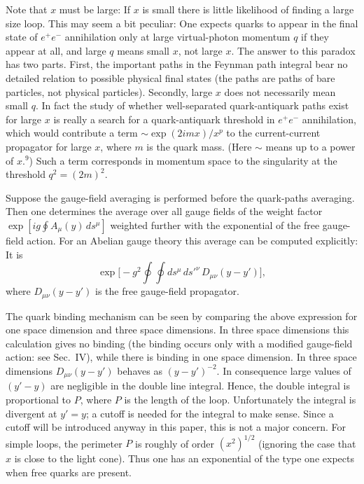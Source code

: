 Note that $x$ must be large:  If $x$ is small there is little likelihood
of finding a large size loop.  This may seem a bit peculiar:  One expects
quarks to appear in the final state of $e^{+}e^{-}$ annihilation only at
large virtual-photon momentum $q$ if they appear at all, and large $q$
means small $x$, not large $x$.  The answer to this paradox has two
parts.  First, the important paths in the Feynman path integral bear no
detailed relation to possible physical final states (the paths are paths
of bare particles, not physical particles).  Secondly, large $x$ does
not necessarily mean small $q$.  In fact the study of whether
well-separated quark-antiquark paths exist for large $x$ is really a
search for a quark-antiquark threshold in $e^{+}e^{-}$ annihilation,
which would contribute a term $\sim \exp(2imx)/x^{p}$ to the
current-current propagator for large $x$, where $m$ is the quark mass.
(Here $\sim$ means up to a power of $x$.${}^{9}$)  Such a term
corresponds in momentum space to the singularity at the threshold
$q^{2} = (2m)^{2}$.

Suppose the gauge-field averaging is performed before the quark-paths
averaging.  Then one determines the average over all gauge fields of the
weight factor $\exp[ig\oint A_{\mu}(y)\,ds^{\mu}]$ weighted further with
the exponential of the free gauge-field action.  For an Abelian gauge
theory this average can be computed explicitly:  It is
\[
  \exp\!\Big[-g^{2}\oint\!\!\oint ds^{\mu}\,ds'^{\nu}\,D_{\mu\nu}(y-y')\Big],
\]
where $D_{\mu\nu}(y-y')$ is the free gauge-field propagator.

The quark binding mechanism can be seen by comparing the above
expression for one space dimension and three space dimensions.  In three
space dimensions this calculation gives no binding (the binding occurs
only with a modified gauge-field action:  see Sec.~IV), while there is
binding in one space dimension.  In three space dimensions
$D_{\mu\nu}(y-y')$ behaves as $(y-y')^{-2}$.  In consequence large
values of $(y'-y)$ are negligible in the double line integral.  Hence,
the double integral is proportional to $P$, where $P$ is the length of
the loop.  Unfortunately the integral is divergent at $y'=y$; a cutoff
is needed for the integral to make sense.  Since a cutoff will be
introduced anyway in this paper, this is not a major concern.  For
simple loops, the perimeter $P$ is roughly of order $(x^{2})^{1/2}$
(ignoring the case that $x$ is close to the light cone).  Thus one has
an exponential of the type one expects when free quarks are present.


